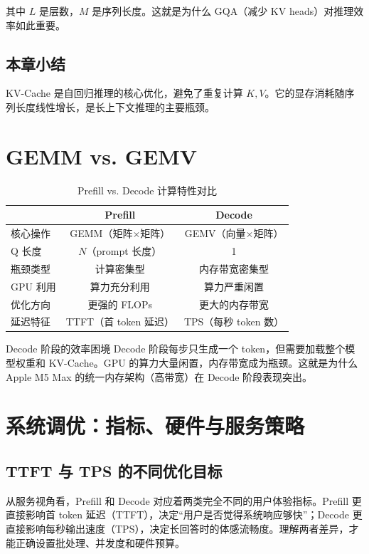 \documentclass[a4paper]{article}
\begin{document}
其中 $L$ 是层数，$M$ 是序列长度。这就是为什么 GQA（减少 KV heads）对推理效率如此重要。

\subsection{本章小结}

KV-Cache 是自回归推理的核心优化，避免了重复计算 $K, V$。它的显存消耗随序列长度线性增长，是长上下文推理的主要瓶颈。

\section{GEMM vs. GEMV}

\begin{table}[H]
\centering
\caption{Prefill vs. Decode 计算特性对比}
\begin{tabular}{lcc}
\toprule
& \textbf{Prefill} & \textbf{Decode} \\
\midrule
核心操作 & GEMM（矩阵$\times$矩阵） & GEMV（向量$\times$矩阵） \\
Q 长度 & $N$（prompt 长度） & 1 \\
瓶颈类型 & 计算密集型 & 内存带宽密集型 \\
GPU 利用 & 算力充分利用 & 算力严重闲置 \\
优化方向 & 更强的 FLOPs & 更大的内存带宽 \\
延迟特征 & TTFT（首 token 延迟） & TPS（每秒 token 数） \\
\bottomrule
\end{tabular}
\end{table}

\begin{warningbox}{Decode 阶段的效率困境}
Decode 阶段每步只生成一个 token，但需要加载整个模型权重和 KV-Cache。GPU 的算力大量闲置，内存带宽成为瓶颈。这就是为什么 Apple M5 Max 的统一内存架构（高带宽）在 Decode 阶段表现突出。
\end{warningbox}

\section{系统调优：指标、硬件与服务策略}

\subsection{TTFT 与 TPS 的不同优化目标}
从服务视角看，Prefill 和 Decode 对应着两类完全不同的用户体验指标。Prefill 更直接影响首 token 延迟（TTFT），决定“用户是否觉得系统响应够快”；Decode 更直接影响每秒输出速度（TPS），决定长回答时的体感流畅度。理解两者差异，才能正确设置批处理、并发度和硬件预算。
\end{document}

